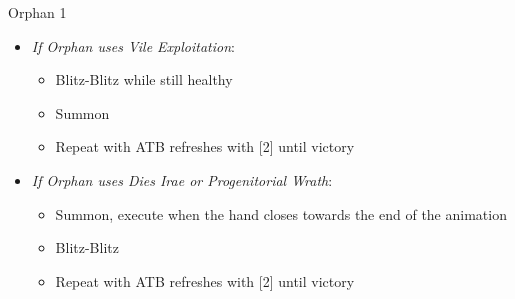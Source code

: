 \begin{battle}[3:00]{Orphan 1}
\begin{itemize}
\begin{itemize}
			\item \textit{If Orphan uses Vile Exploitation}:
			      \begin{itemize}
				      \item Blitz-Blitz while still healthy
				      \item Summon
				      \item Repeat with ATB refreshes with [2] until victory
			      \end{itemize}
			\item \textit{If Orphan uses Dies Irae or Progenitorial Wrath}:
			      \begin{itemize}
				      \item Summon, execute when the hand closes towards the end of the animation
  				      \item Blitz-Blitz
				      \item Repeat with ATB refreshes with [2] until victory
			      \end{itemize}
			      \end{itemize}
		\end{itemize}
\end{battle}